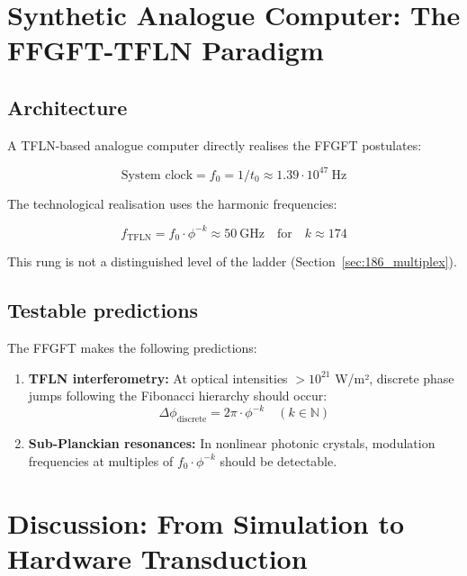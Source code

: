 	\section{Synthetic Analogue Computer: The FFGFT-TFLN Paradigm}
	
	\subsection{Architecture}
	
	A TFLN-based analogue computer directly realises the FFGFT postulates:
	
	\begin{equation}
		\text{System clock} = f_0 = 1/t_0 \approx 1.39 \cdot 10^{47}~\text{Hz}
	\end{equation}
	
	The technological realisation uses the harmonic frequencies:
	
	\begin{equation}
		f_{\text{TFLN}} = f_0 \cdot \phi^{-k} \approx 50~\text{GHz} \quad \text{for} \quad k \approx 174
	\end{equation}
	
	This rung is not a distinguished level of the ladder (Section~\ref{sec:186_multiplex}).
	
	\subsection{Testable predictions}
	
	The FFGFT makes the following predictions:
	
	\begin{enumerate}
		\item \textbf{TFLN interferometry:} At optical intensities $>10^{21}$ W/m², discrete phase jumps following the Fibonacci hierarchy should occur:
		\begin{equation}
			\Delta \phi_{\text{discrete}} = 2\pi \cdot \phi^{-k} \quad (k \in \mathbb{N})
		\end{equation}
		
		\item \textbf{Sub-Planckian resonances:} In nonlinear photonic crystals, modulation frequencies at multiples of $f_0 \cdot \phi^{-k}$ should be detectable.
	\end{enumerate}
	
	\section{Discussion: From Simulation to Hardware Transduction}
	

